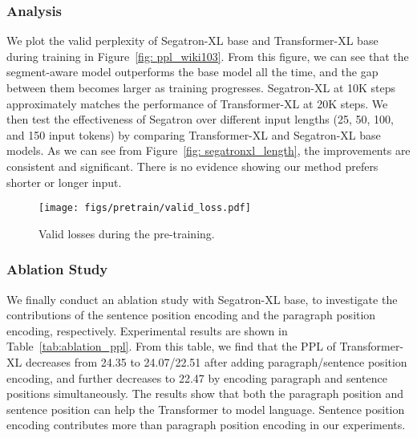 \documentclass[letterpaper]{article}
\begin{document}
\subsubsection{Analysis}
We plot the valid perplexity of Segatron-XL base and Transformer-XL base during training in Figure~\ref{fig: ppl_wiki103}. 
From this figure, we can see that the segment-aware model outperforms the base model all the time, and the gap between them becomes larger as training progresses. 
Segatron-XL at 10K steps approximately matches the performance of Transformer-XL at 20K steps.
We then test the effectiveness of Segatron over different input lengths (25, 50, 100, and 150 input tokens) by comparing Transformer-XL and Segatron-XL base models.
As we can see from Figure~\ref{fig: segatronxl_length}, the improvements are consistent and significant. 
There is no evidence showing our method prefers shorter or longer input.


\begin{figure}[t]
  \centering
  \texttt{[image: figs/pretrain/valid\_loss.pdf]}
\caption{Valid losses during the pre-training.}
  \label{fig: ppl_pretrain}
\end{figure} 
\subsubsection{Ablation Study}
We finally conduct an ablation study with Segatron-XL base, to investigate the contributions of the sentence position encoding and the paragraph position encoding, respectively. 
Experimental results are shown in Table~\ref{tab:ablation_ppl}.
From this table, we find that the PPL of Transformer-XL decreases from 24.35 to 24.07/22.51 after adding paragraph/sentence position encoding, and further decreases to 22.47 by encoding paragraph and sentence positions simultaneously.
The results show that both the paragraph position and sentence position can help the Transformer to model language. 
Sentence position encoding contributes more than paragraph position encoding in our experiments. 
\end{document}
